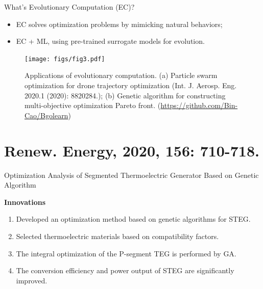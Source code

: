 \documentclass{beamer}
\begin{document}
\begin{frame}{What's Evolutionary Computation (EC)?}
    \small
	\begin{itemize}
		\item {
			EC solves optimization problems by mimicking natural behaviors;
		}
		\item {
			EC + ML, using pre-trained surrogate models for evolution.
		}
	\end{itemize}

	\begin{figure}
		\centering
		\texttt{[image: figs/fig3.pdf]}
		\caption{Applications of evolutionary computation. (a) Particle swarm optimization for drone trajectory optimization (Int. J. Aerosp. Eng. 2020.1 (2020): 8820284.); (b) Genetic algorithm for constructing multi-objective optimization Pareto front. (\url{https://github.com/Bin-Cao/Bgolearn})}
		\label{fig3}
	\end{figure}
\end{frame}


\section{Renew. Energy, 2020, 156: 710-718.}

\begin{frame}{Optimization Analysis of Segmented Thermoelectric Generator Based on Genetic Algorithm}
	\begin{block}{\textbf{Innovations}}
		\begin{enumerate}
			\item Developed an optimization method based on genetic algorithms for STEG.
			\item Selected thermoelectric materials based on compatibility factors.
			\item The integral optimization of the P-segment TEG is performed by GA.
			\item The conversion efficiency and power output of STEG are significantly improved.
		\end{enumerate}
	\end{block}
\end{frame}
\end{document}
